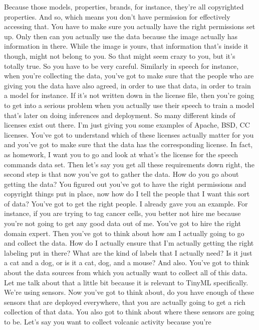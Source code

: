 Because those models, properties, brands, for instance,
they're all copyrighted properties.
And so, which means you don't have permission
for effectively accessing that.
You have to make sure you actually have the right permissions set up.
Only then can you actually use the data because the image
actually has information in there.
While the image is yours, that information that's inside it though,
might not belong to you.
So that might seem crazy to you, but it's totally true.
So you have to be very careful.
Similarly in speech for instance, when you're collecting the data,
you've got to make sure that the people who are giving you the data
have also agreed, in order to use that data,
in order to train a model for instance.
If it's not written down in the license file,
then you're going to get into a serious problem
when you actually use their speech to train a model that's later
on doing inferences and deployment.
So many different kinds of licenses exist out there.
I'm just giving you some examples of Apache, BSD, CC licenses.
You've got to understand which of these licenses
actually matter for you and you've got to make sure that the data has
the corresponding license.
In fact, as homework, I want you to go and look
at what's the license for the speech commands data set.
Then let's say you get all these requirements down right,
the second step is that now you've got to gather the data.
How do you go about getting the data?
You figured out you've got to have the right permissions and copyright
things put in place, now how do I tell the people that I
want this sort of data?
You've got to get the right people.
I already gave you an example.
For instance, if you are trying to tag cancer cells,
you better not hire me because you're not
going to get any good data out of me.
You've got to hire the right domain expert.
Then you've got to think about how am I actually going
to go and collect the data.
How do I actually ensure that I'm actually getting
the right labeling put in there?
What are the kind of labels that I actually need?
Is it just a cat and a dog, or is it a cat, dog, and a mouse?
And also.
You've got to think about the data sources from which you actually
want to collect all of this data.
Let me talk about that a little bit because it is relevant to TinyML
specifically.
We're using sensors.
Now you've got to think about, do you have enough of these sensors that
are deployed everywhere, that you are actually going
to get a rich collection of that data.
You also got to think about where these sensors are going to be.
Let's say you want to collect volcanic activity because you're
